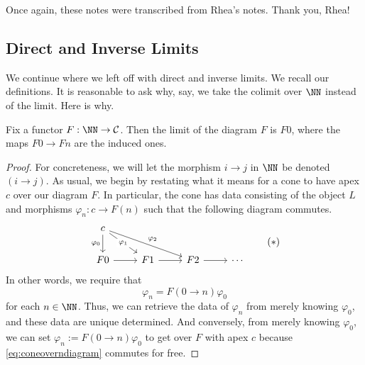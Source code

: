 \documentclass[../notes.tex]{subfiles}
\begin{document}

Once again, these notes were transcribed from Rhea's notes. Thank you, Rhea!

\subsection{Direct and Inverse Limits}
We continue where we left off with direct and inverse limits. We recall our definitions.
\directlimdef*
\invlimdef*
\noindent It is reasonable to ask why, say, we take the colimit over $\NN$ instead of the limit. Here is why.
\begin{exe}
	Fix a functor $F:\NN\to\mathcal C$. Then the limit of the diagram $F$ is $F0$, where the maps $F0\to Fn$ are the induced ones.
\end{exe}
\begin{proof}
	For concreteness, we will let the morphism $i\to j$ in $\NN$ be denoted $(i\to j)$. As usual, we begin by restating what it means for a cone to have apex $c$ over our diagram $F$. In particular, the cone has data consisting of the object $L$ and morphisms $\varphi_n:c\to F(n)$ such that the following diagram commutes.
	\[\begin{tikzcd}
		c \\
		F0 & F1 & F2 & \cdots
		\arrow["{\varphi_0}"', from=1-1, to=2-1]
		\arrow[from=2-1, to=2-2]
		\arrow[from=2-2, to=2-3]
		\arrow[from=2-3, to=2-4]
		\arrow["{\varphi_1}"{description}, from=1-1, to=2-2]
		\arrow["{\varphi_2}", from=1-1, to=2-3]
	\end{tikzcd}\tag{$*$}\label{eq:coneoverndiagram}\]
	In other words, we require that
	\[\varphi_n=F(0\to n)\varphi_0\]
	for each $n\in\NN$. Thus, we can retrieve the data of $\varphi_n$ from merely knowing $\varphi_0$, and these data are unique determined. And conversely, from merely knowing $\varphi_0$, we can set $\varphi_n:=F(0\to n)\varphi_0$ to get over $F$ with apex $c$ because \autoref{eq:coneoverndiagram} commutes for free.


\end{proof}
\end{document}
